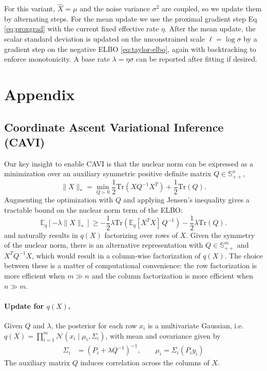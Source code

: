 \documentclass[11pt]{article}
\begin{document}
For this variant, $\hat{X}=\mu$ and the noise variance $\sigma^2$ are coupled, so we update them by alternating steps. For the mean update we use the proximal gradient step Eq \eqref{eq:proxgrad} with the current fixed effective rate $\eta$. After the mean update, the scalar standard deviation is updated on the unconstrained scale $\ell=\log \sigma$ by a gradient step on the negative ELBO \eqref{eq:taylor-elbo}, again with backtracking to enforce monotonicity. A base rate $\lambda=\eta\sigma$ can be reported after fitting if desired.


\printbibliography

\section{Appendix}

\subsection{Coordinate Ascent Variational Inference (CAVI)} \label{app:cavi}

Our key insight to enable CAVI is that the nuclear norm can be expressed as a minimization over an auxiliary symmetric positive definite matrix $Q \in \mathbb{S}_{++}^n$,
\begin{equation} \|X\|_* = \min_{Q \succ 0} \frac{1}{2} \text{Tr}(X Q^{-1} X^T) + \frac{1}{2} \text{Tr}(Q).
\end{equation}
Augmenting the optimization with $Q$ and applying Jensen's inequality gives a tractable bound on the nuclear norm term of the ELBO: 
\begin{equation} \mathbb{E}_{q}[-\lambda \|X\|_*] \ge -\frac12 \lambda \mathrm{Tr}\!\left(\mathbb{E}_{q}[X^T X]\, Q^{-1}\right) - \frac12 \lambda \mathrm{Tr}(Q).
\end{equation}
and naturally results in $q(X)$ factorizing over rows of $X$. Given the symmetry of the nuclear norm, there is an alternative representation with $Q \in \mathbb{S}_{++}^m$ and $X^T Q^{-1} X$, which would result in a column-wise factorization of $q(X)$. The choice between these is a matter of computational convenience: the row factorization is more efficient when $m \gg n$ and the column factorization is more efficient when $n \gg m$. 

\paragraph{Update for $q(X)$.} Given $Q$ and $\lambda$, the posterior for each row $x_i$ is a multivariate Gaussian, i.e. $q(X) = \prod_{i=1}^m \mathcal{N}(x_i \mid \mu_i, \Sigma_i)$, with mean and covariance given by
\begin{align} \Sigma_i &= \left( P_i + \lambda Q^{-1} \right)^{-1}, \qquad \mu_i = \Sigma_i \left( P_i y_i \right)
\end{align}
The auxiliary matrix $Q$ induces correlation across the columns of $X$. 
\end{document}
